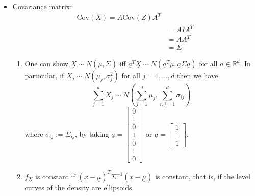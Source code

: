 \documentclass{article}
\newcommand{\R}{\mathbb{R}}
\newcommand{\inv}{^{-1}}
\newcommand{\Cov}{\mathrm{Cov}}
\begin{document}
\begin{itemize}
						\item Covariance matrix:
						\begin{align*}
							\Cov(\underline{X})=A\Cov(\underline{Z})A^T\\
							&=AIA^T\\
							&=AA^T\\
							&=\Sigma
						\end{align*}
						
						\begin{myrem*}{}{}
							\begin{enumerate}
								\item One can show $\underline{X}\sim N(\underline{\mu}, \Sigma)$ iff $\underline{a}^T\underline{X}\sim N(\underline{a}^T\underline{\mu}, \underline{a}\Sigma\underline{a})$ for all $a\in\R^d$. In particular, if $X_j\sim N(\mu_j, \sigma_j^2)$ for all $j=1, \dots, d$ then we have
								$$\sum_{j=1}^dX_j\sim N(\sum_{j=1}^d\mu_j, \sum_{i, j=1}^d\sigma_{ij})$$
								where $\sigma_{ij}:=\Sigma_{ij}$, by taking $\underline{a}=\begin{bmatrix}
								0\\
								\vdots\\
								0\\
								1\\
								0\\
								\vdots\\
								0
								\end{bmatrix}$ or $\underline{a}=\begin{bmatrix}
									1\\
									\vdots\\
									1
								\end{bmatrix}$.
								
								\item $f_{\underline{X}}$ is constant if $(\underline{x}-\underline{\mu})^T\Sigma\inv(\underline{x}-\underline{\mu})$ is constant, that is, if the level curves of the density are ellipsoids.
								

\end{enumerate}
\end{myrem*}
\end{itemize}
\end{document}
